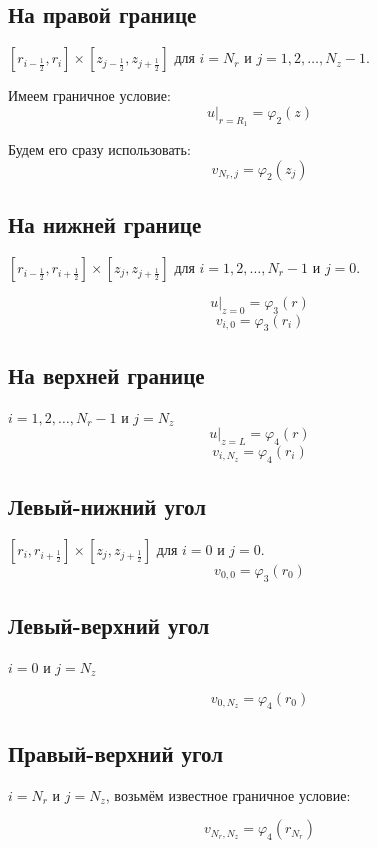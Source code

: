 \subsection{На правой границе}
$ [r_{i -\frac{1}{2}}, r_{i}] \times  [z_{j -\frac{1}{2}}, z_{j +\frac{1}{2}}] $
для $ i = N_r $ и $ j = 1, 2, \dots, N_z - 1$.

Имеем граничное условие:
\[ \left . u \right \vert_{r=R_1} = \varphi_2(z) \]

Будем его сразу использовать:
\[ v_{N_r,j} = \varphi_2(z_j) \]

\subsection{На нижней границе}
$ [r_{i  -\frac{1}{2}}, r_{i +\frac{1}{2}}] \times  [z_{j}, z_{j +\frac{1}{2}}] $
для $ i = 1, 2, \dots, N_r - 1 $ и $ j = 0$.

\[ \left . u \right \vert_{z=0} = \varphi_3(r) \]
\[ v_{i,0} = \varphi_3(r_i) \]

\subsection{На верхней границе}
$ i = 1, 2, \dots, N_r - 1 $ и $ j = N_z $
\[ \left . u \right \vert_{z=L} = \varphi_4(r) \]
\[ v_{i,N_z} = \varphi_4(r_i) \]

\subsection{Левый-нижний угол}

$ [r_{i}, r_{i +\frac{1}{2}}] \times  [z_{j}, z_{j +\frac{1}{2}}] $
для $ i = 0 $ и $ j = 0$.
\[ v_{0,0} = \varphi_3(r_0) \]

\subsection{Левый-верхний угол}

$ i = 0 $ и $ j = N_z $

\[ v_{0,N_z} = \varphi_4(r_0) \]

\subsection{Правый-верхний угол}

$ i = N_r $ и $ j = N_z $, возьмём известное граничное условие:

\[ v_{N_r,N_z} = \varphi_4(r_{N_r}) \]

